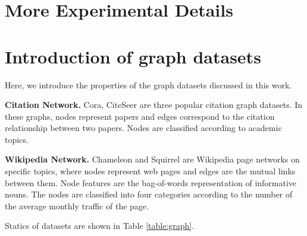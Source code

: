 \documentclass{article}
\theoremstyle{definition}
\theoremstyle{remark}
\theoremstyle{theorem}
\begin{document}
\begin{table}[h]
	\centering
	\caption{Results comparison on different plugging positions of ContraNorm. Experiments are evaluated on the validation set of GLUE tasks. \textbf{Avg} denotes the average performance on all the tasks. The best result for each task is bolded.} 
	\label{table:pos}
\end{table}


\section{More Experimental Details}

\section{Introduction of graph datasets} \label{appen:data}

Here, we introduce the properties of the graph datasets discussed in this work.

\textbf{Citation Network.} Cora, CiteSeer are three popular citation graph datasets. In these graphs, nodes represent papers and edges correspond to the citation relationship between two papers. Nodes are classified according to academic topics.

\textbf{Wikipedia Network.} Chameleon and Squirrel are Wikipedia page networks on specific topics, where nodes represent web pages and edges are the mutual links between them. Node features are the bag-of-words representation of informative nouns. The nodes are classified into four categories according to the number of the average monthly traffic of the page.

Statics of datasets are shown in Table \ref{table:graph}.
\end{document}
